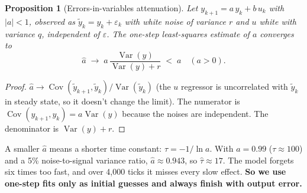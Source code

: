\documentclass[11pt]{article}
\theoremstyle{plain}
\newtheorem{proposition}[theorem]{Proposition}
\theoremstyle{definition}
\theoremstyle{remark}
\newcommand{\abs}[1]{\left\lvert #1 \right\rvert}
\begin{document}
\begin{proposition}[Errors-in-variables attenuation]\label{prop:eiv}
Let $y_{k+1}=a\,y_k+b\,u_k$ with $\abs a<1$, observed as $\tilde y_k=y_k+\varepsilon_k$ with white noise of variance $r$ and $u$ white with variance $q$, independent of $\varepsilon$. The one-step least-squares estimate of $a$ converges to
\[
\hat a\;\to\;a\,\frac{\operatorname{Var}(y)}{\operatorname{Var}(y)+r}\;<\;a\quad(a>0).
\]
\end{proposition}
\begin{proof}
$\hat a\to\operatorname{Cov}(\tilde y_{k+1},\tilde y_k)/\operatorname{Var}(\tilde y_k)$ (the $u$ regressor is uncorrelated with $\tilde y_k$ in steady state, so it doesn't change the limit). The numerator is $\operatorname{Cov}(y_{k+1},y_k)=a\operatorname{Var}(y)$ because the noises are independent. The denominator is $\operatorname{Var}(y)+r$.
\end{proof}
A smaller $\hat a$ means a shorter time constant: $\tau=-1/\ln a$. With $a=0.99$ ($\tau\approx100$) and a 5\% noise-to-signal variance ratio, $\hat a\approx0.943$, so $\hat\tau\approx17$. The model forgets six times too fast, and over 4,000 ticks it misses every slow effect. \textbf{So we use one-step fits only as initial guesses and always finish with output error.}
\end{document}
